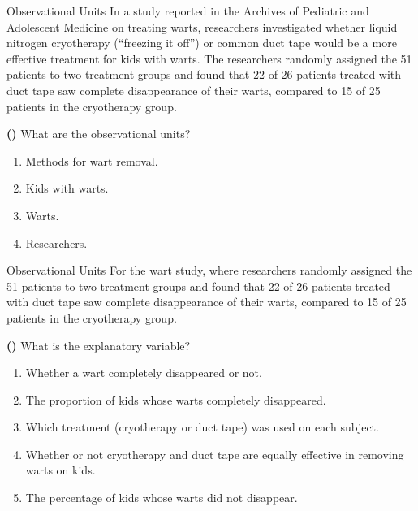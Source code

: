 \documentclass[13pt]{beamer}
\newcounter{count}
\newcommand{\question}{ \textbf{(\decimal{count})} \stepcounter{count}}
\newenvironment{click}{\begin{enumerate}[A]}{\end{enumerate}}
\begin{document}
\begin{frame}{Observational Units}
In a study reported in the Archives of Pediatric and Adolescent Medicine on treating warts, researchers investigated whether liquid nitrogen cryotherapy (“freezing it off”) or common duct tape would be a more effective treatment for kids with warts. The researchers randomly assigned the 51 patients to two treatment groups and found that 22 of 26 patients treated with duct tape saw complete disappearance of their warts, compared to 15 of 25 patients in the cryotherapy group.\smallskip

\question What are the observational units?

\begin{click}
   \item Methods for wart removal.
   \item Kids with warts. %
   \item Warts.
   \item Researchers.
\end{click}
\end{frame}

\begin{frame}{Observational Units}
For the wart study, where researchers randomly assigned the 51 patients to two treatment groups and found that 22 of 26 patients treated with duct tape saw complete disappearance of their warts, compared to 15 of 25 patients in the cryotherapy group.\smallskip

\question What is the explanatory variable?

\begin{click}
   \item Whether a wart completely disappeared or not.
   \item The proportion of kids whose warts completely disappeared.
   \item Which treatment (cryotherapy or duct tape) was used on each subject.%
   \item Whether or not cryotherapy and duct tape are equally effective in removing warts on kids.
   \item The percentage of kids whose warts did not disappear.
\end{click}
\end{frame}
\end{document}

